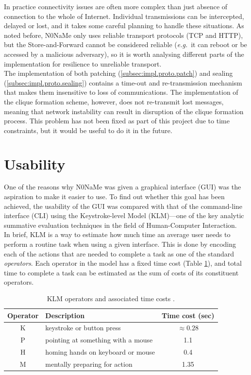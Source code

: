 \documentclass[a4paper, twoside, 12pt]{report}
\newcommand{\funkytt}{\fontfamily{AnonymousPro}\selectfont}
\begin{document}
In practice connectivity issues are often more complex than just absence of connection to the whole of Internet. Individual transmissions can be intercepted, delayed or lost, and it takes some careful planning to handle these situations. As noted before, {\funkytt N0NaMe} only uses reliable transport protocols (TCP and HTTP), but the Store-and-Forward cannot be considered reliable (\textit{e.g.}~it can reboot or be accessed by a malicious adversary), so it is worth analysing different parts of the implementation for resilience to unreliable transport. \\

The implementation of both patching (\cref{subsec:impl.proto.patch}) and sealing (\cref{subsec:impl.proto.sealing}) contains a time-out and re-transmission mechanism that makes them insensitive to loss of communications. The implementation of the clique formation scheme, however, does not re-transmit lost messages, meaning that network instability can result in disruption of the clique formation process. This problem has not been fixed as part of this project due to time constraints, but it would be useful to do it in the future.

\section{Usability}
\label{sec:eval.usability}
One of the reasons why {\funkytt N0NaMe} was given a graphical interface (GUI) was the aspiration to make it easier to use. To find out whether this goal has been achieved, the usability of the GUI was compared with that of the command-line interface (CLI) using the Keystroke-level Model (KLM)---one of the key analytic summative evaluation techniques in the field of Human-Computer Interaction. \\

In brief, KLM is a way to estimate how much time an average user needs to perform a routine task when using a given interface. This is done by encoding each of the actions that are needed to complete a task as one of the standard \emph{operators}. Each operator in the model has a fixed time cost (Table \ref{tab:KLM}), and total time to complete a task can be estimated as the sum of costs of its constituent operators.

\begin{table}[H]
\centering
\begin{tabular*}{0.79\linewidth}{c | l | c}
Operator & Description & Time cost (sec) \\
\hline
K & keystroke or button press & $\approx 0.28$\footnotemark \\
P & pointing at something with a mouse & 1.1 \\
H & homing hands on keyboard or mouse & 0.4 \\
M & mentally preparing for action & 1.35 \\
\end{tabular*}
\caption{\label{tab:KLM} KLM operators and associated time costs \cite{card1980keystroke, sauro2009estimating}.}
\end{table}
\end{document}

